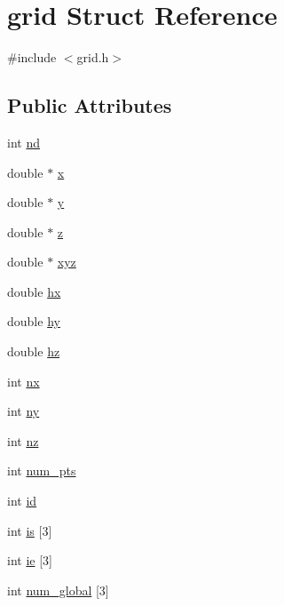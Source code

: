 \hypertarget{structgrid}{}\section{grid Struct Reference}
\label{structgrid}


{\ttfamily \#include $<$grid.\+h$>$}

\subsection*{Public Attributes}
\begin{DoxyCompactItemize}
\item 
int \mbox{\hyperlink{structgrid_a998230b28142df16097fcfd99aa7e60c}{nd}}
\item 
double $\ast$ \mbox{\hyperlink{structgrid_afa4184db76f0dbd3035e6ab77a4b2142}{x}}
\item 
double $\ast$ \mbox{\hyperlink{structgrid_ac7d5cd375ae664f9255e6610e19ea2e0}{y}}
\item 
double $\ast$ \mbox{\hyperlink{structgrid_a4c2b018b3e10df621befcf7099b3ba6d}{z}}
\item 
double $\ast$ \mbox{\hyperlink{structgrid_a65dbfc2726b07f992f0df5767198e0e0}{xyz}}
\item 
double \mbox{\hyperlink{structgrid_a91688427f3973ec33bfbade6d9f4ca1f}{hx}}
\item 
double \mbox{\hyperlink{structgrid_ae2a0981134a14954c5d1401af51d25e0}{hy}}
\item 
double \mbox{\hyperlink{structgrid_ae1e5779b12e4eb40f81aff5beb0980cc}{hz}}
\item 
int \mbox{\hyperlink{structgrid_aca4cc265c1d31d9feffbb48a86aaf4ab}{nx}}
\item 
int \mbox{\hyperlink{structgrid_ad0ecbc4d767ecd05b163ba2794dc3370}{ny}}
\item 
int \mbox{\hyperlink{structgrid_a17a874fad9b1a3557f055de51a48b4c3}{nz}}
\item 
int \mbox{\hyperlink{structgrid_a2c05803b204a160e7933a0836bf5ea73}{num\+\_\+pts}}
\item 
int \mbox{\hyperlink{structgrid_a4d49c9de8412217e0575c134f24d8138}{id}}
\item 
int \mbox{\hyperlink{structgrid_a64fa43aa8ae42c8e0028a225da2316d0}{is}} \mbox{[}3\mbox{]}
\item 
int \mbox{\hyperlink{structgrid_a657f113c75a4a7248524e81e73a8e090}{ie}} \mbox{[}3\mbox{]}
\item 
int \mbox{\hyperlink{structgrid_afb2c866cae94e082f10339c996f86484}{num\+\_\+global}} \mbox{[}3\mbox{]}

\end{DoxyCompactItemize}

